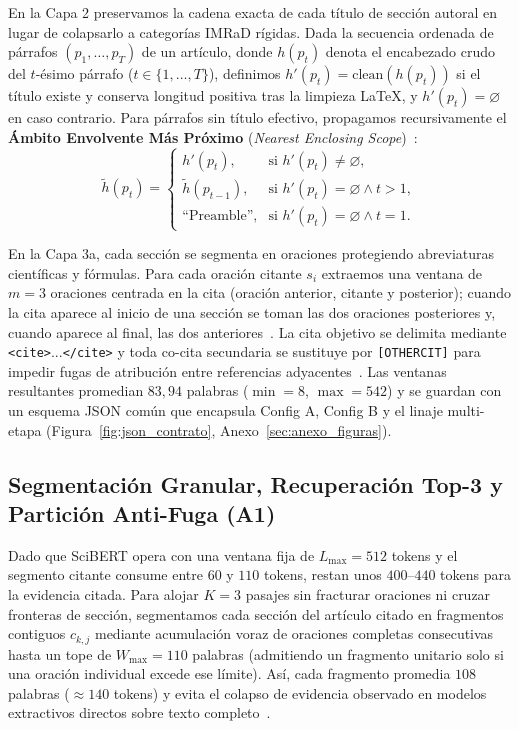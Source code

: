 \documentclass[conference]{IEEEtran}
\begin{document}
En la Capa 2 preservamos la cadena exacta de cada título de sección autoral en lugar de colapsarlo a categorías IMRaD rígidas. Dada la secuencia ordenada de párrafos $(p_1, \dots, p_T)$ de un artículo, donde $h(p_t)$ denota el encabezado crudo del $t$-ésimo párrafo ($t \in \{1, \dots, T\}$), definimos $h'(p_t) = \text{clean}(h(p_t))$ si el título existe y conserva longitud positiva tras la limpieza \LaTeX{}, y $h'(p_t) = \varnothing$ en caso contrario. Para párrafos sin título efectivo, propagamos recursivamente el \textbf{Ámbito Envolvente Más Próximo} (\textit{Nearest Enclosing Scope})~\cite{paolini2025citefusion,goffman1974frame}:
\begin{equation*}
\tilde{h}(p_t) = \begin{cases}
h'(p_t), & \text{si } h'(p_t) \neq \varnothing, \\
\tilde{h}(p_{t-1}), & \text{si } h'(p_t) = \varnothing \land t > 1, \\
\text{``Preamble''}, & \text{si } h'(p_t) = \varnothing \land t = 1.
\end{cases}
\end{equation*}

En la Capa 3a, cada sección se segmenta en oraciones protegiendo abreviaturas científicas y fórmulas. Para cada oración citante $s_i$ extraemos una ventana de $m=3$ oraciones centrada en la cita (oración anterior, citante y posterior); cuando la cita aparece al inicio de una sección se toman las dos oraciones posteriores y, cuando aparece al final, las dos anteriores~\cite{lauscher2022multicite}. La cita objetivo se delimita mediante \texttt{<cite>}...\texttt{</cite>} y toda co-cita secundaria se sustituye por \texttt{[OTHERCIT]} para impedir fugas de atribución entre referencias adyacentes~\cite{lyu2021classification}. Las ventanas resultantes promedian $83,94$ palabras ($\min = 8$, $\max = 542$) y se guardan con un esquema JSON común que encapsula Config A, Config B y el linaje multi-etapa (Figura~\ref{fig:json_contrato}, Anexo~\ref{sec:anexo_figuras}).

\subsection{Segmentación Granular, Recuperación Top-3 y Partición Anti-Fuga (A1)}

Dado que SciBERT opera con una ventana fija de $L_{\max} = 512$ tokens y el segmento citante consume entre $60$ y $110$ tokens, restan unos $400\text{--}440$ tokens para la evidencia citada. Para alojar $K=3$ pasajes sin fracturar oraciones ni cruzar fronteras de sección, segmentamos cada sección del artículo citado en fragmentos contiguos $c_{k,j}$ mediante acumulación voraz de oraciones completas consecutivas hasta un tope de $W_{\max} = 110$ palabras (admitiendo un fragmento unitario solo si una oración individual excede ese límite). Así, cada fragmento promedia $108$ palabras ($\approx 140$ tokens) y evita el colapso de evidencia observado en modelos extractivos directos sobre texto completo~\cite{lauscher2022multicite}.
\end{document}
